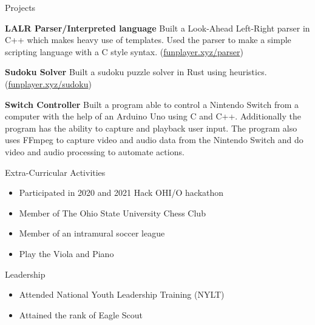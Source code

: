 \documentclass{resume}
\begin{document}
\begin{rSection}{Projects}
    \vspace{-1.25em}
    \item \textbf{LALR Parser/Interpreted language} Built a Look-Ahead Left-Right parser in C++ which makes heavy use of templates.
    Used the parser to make a simple scripting language with a C style syntax.
    (\href{https://funplayer.xyz/parser}{funplayer.xyz/parser})
    \item \textbf{Sudoku Solver} Built a sudoku puzzle solver in Rust using heuristics.
    (\href{https://funplayer.xyz/sudoku}{funplayer.xyz/sudoku})
    \item \textbf{Switch Controller} Built a program able to control a Nintendo Switch
    from a computer with the help of an Arduino Uno using C and C++.
    Additionally the program has the ability to capture and playback user input.
    The program also uses FFmpeg to capture video and audio data from the Nintendo Switch
    and do video and audio processing to automate actions.
\end{rSection}

\begin{rSection}{Extra-Curricular Activities}
    \begin{itemize}
        \item Participated in 2020 and 2021 Hack OHI/O hackathon
        \item Member of The Ohio State University Chess Club
        \item Member of an intramural soccer league
        \item Play the Viola and Piano
    \end{itemize}
\end{rSection}

\begin{rSection}{Leadership}
    \begin{itemize}
        \item Attended National Youth Leadership Training (NYLT)
        \item Attained the rank of Eagle Scout
    \end{itemize}
\end{rSection}
\end{document}
